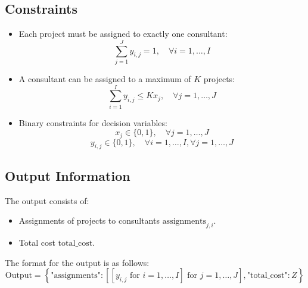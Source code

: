 \documentclass{article}
\begin{document}
\subsection*{Constraints}
\begin{itemize}
    \item Each project must be assigned to exactly one consultant:
    \[
    \sum_{j=1}^{J} y_{i,j} = 1, \quad \forall i = 1, \ldots, I
    \]
    
    \item A consultant can be assigned to a maximum of \( K \) projects:
    \[
    \sum_{i=1}^{I} y_{i,j} \leq K x_j, \quad \forall j = 1, \ldots, J
    \]
    
    \item Binary constraints for decision variables:
    \[
    x_j \in \{0, 1\}, \quad \forall j = 1, \ldots, J
    \]
    \[
    y_{i,j} \in \{0, 1\}, \quad \forall i = 1, \ldots, I, \forall j = 1, \ldots, J
    \]
\end{itemize}

\subsection*{Output Information}
The output consists of:
\begin{itemize}
    \item Assignments of projects to consultants \( \text{assignments}_{j,i} \).
    \item Total cost \( \text{total\_cost} \).
\end{itemize}
The format for the output is as follows:
\[
\text{Output} = \left\{ 
    \text{"assignments"}: \left[ [y_{i,j} \text{ for } i=1, \ldots, I] \text{ for } j=1, \ldots, J \right], 
    \text{"total\_cost"}: Z 
\right\}
\]
\end{document}
